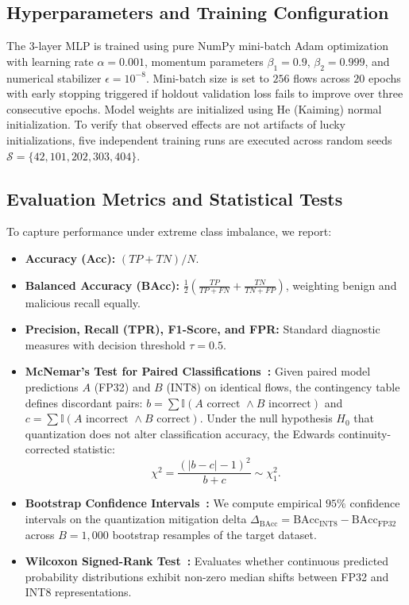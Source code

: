 \subsection{Hyperparameters and Training Configuration}
The 3-layer MLP is trained using pure NumPy mini-batch Adam optimization with learning rate $\alpha = 0.001$, momentum parameters $\beta_1 = 0.9$, $\beta_2 = 0.999$, and numerical stabilizer $\epsilon = 10^{-8}$. Mini-batch size is set to $256$ flows across $20$ epochs with early stopping triggered if holdout validation loss fails to improve over three consecutive epochs. Model weights are initialized using He (Kaiming) normal initialization. To verify that observed effects are not artifacts of lucky initializations, five independent training runs are executed across random seeds $\mathcal{S} = \{42, 101, 202, 303, 404\}$.

\subsection{Evaluation Metrics and Statistical Tests}
To capture performance under extreme class imbalance, we report:
\begin{itemize}
    \item \textbf{Accuracy (Acc):} $(TP + TN) / N$.
    \item \textbf{Balanced Accuracy (BAcc):} $\frac{1}{2}\left(\frac{TP}{TP + FN} + \frac{TN}{TN + FP}\right)$, weighting benign and malicious recall equally.
    \item \textbf{Precision, Recall (TPR), F1-Score, and FPR:} Standard diagnostic measures with decision threshold $\tau = 0.5$.
    \item \textbf{McNemar's Test for Paired Classifications~\cite{mcnemar1947note}:} Given paired model predictions $A$ (FP32) and $B$ (INT8) on identical flows, the contingency table defines discordant pairs: $b = \sum \mathbb{I}(A \text{ correct } \land B \text{ incorrect})$ and $c = \sum \mathbb{I}(A \text{ incorrect } \land B \text{ correct})$. Under the null hypothesis $H_0$ that quantization does not alter classification accuracy, the Edwards continuity-corrected statistic:
    \begin{equation}
    \chi^2 = \frac{(|b - c| - 1)^2}{b + c} \sim \chi^2_1.
    \end{equation}
    \item \textbf{Bootstrap Confidence Intervals~\cite{efron1994introduction}:} We compute empirical $95\%$ confidence intervals on the quantization mitigation delta $\Delta_{\text{BAcc}} = \text{BAcc}_{\text{INT8}} - \text{BAcc}_{\text{FP32}}$ across $B = 1,000$ bootstrap resamples of the target dataset.
    \item \textbf{Wilcoxon Signed-Rank Test~\cite{wilcoxon1945individual}:} Evaluates whether continuous predicted probability distributions exhibit non-zero median shifts between FP32 and INT8 representations.
\end{itemize}

